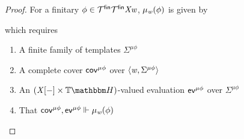 \begin{proof}
    For a finitary $\phi \in \mathcal{T}^{\mathsf{fin}}\mathcal{T}^{\mathsf{fin}}\mathit{X}\mathit{w}$, $\mu_{\mathit{w}}(\phi)$ is given by
    \begin{center}
    \end{center}
    which requires
    \begin{enumerate}
        \item A finite family of templates $\Sigma^{\mu\phi}$
        \item A complete cover $\mathsf{cov}^{\mu\phi}$ over $\langle\mathit{w}, \Sigma^{\mu\phi}\rangle$
        \item An $(\vX\anyL\dash \times \theapF)$-valued evaluation $\mathsf{ev}^{\mu\phi}$ over $\Sigma^{\mu\phi}$
        \item That $\mathsf{cov}^{\mu\phi},\mathsf{ev}^{\mu\phi} \Vdash \mu_{\mathit{w}}(\phi)$
    \end{enumerate}


\end{proof}
